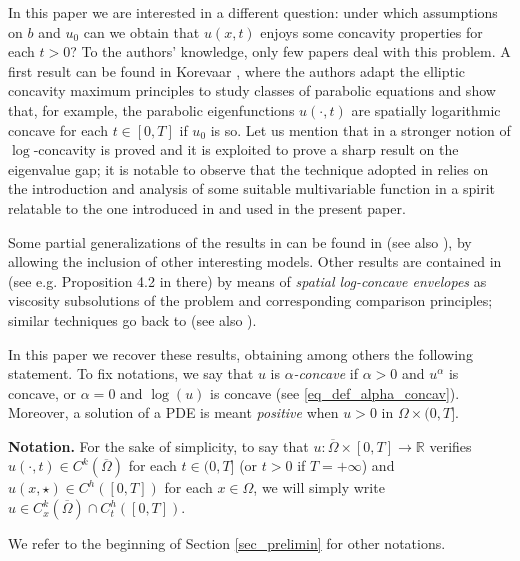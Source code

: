 \documentclass[11pt, reqno]{amsart}
\theoremstyle{definition}
\numberwithin{equation}{section}
\newcommand{\Omegabar}{\overline{\Omega}}
\newcommand{\R}{\mathbb{R}}
\begin{document}
In this paper we are interested in a different question: under which assumptions on $b$ and $u_0$ can we obtain that $u(x,t)$ enjoys some concavity properties for each $t>0$?
To the authors' knowledge, only few papers deal with this problem. 
A first result can be found in Korevaar \cite{Korevaar}, where the authors adapt the elliptic concavity maximum principles to study classes of parabolic equations and show that, for example, the parabolic eigenfunctions $u(\cdot, t)$ are spatially logarithmic concave for each $t \in [0,T]$ if $u_0$ is so. 
Let us mention that in \cite{AnCl11} a stronger notion of $\log$-concavity is proved and it is exploited to prove a sharp result on the eigenvalue gap; it is notable to observe that the technique adopted in \cite{AnCl11} relies on the introduction and analysis of some suitable multivariable function in a spirit relatable to the one introduced in \cite{Korevaar, kennington} and used in the present paper.

Some partial generalizations of the results in \cite{Korevaar} can be found in \cite{PorruSerra} (see also \cite{GrecoKawohl}), by allowing the inclusion of other interesting models. 
Other results are contained in \cite{IshigeSalaniTakatsu2024} (see e.g. Proposition 4.2 in there) by means of \emph{spatial log-concave envelopes} as viscosity subsolutions of the problem and corresponding comparison principles; similar techniques go back to \cite{AlvarezLasryLions1997} (see also \cite{ColesantiSalani2003}).

\smallskip

In this paper we recover these results, obtaining among others the following statement. To fix notations, we say that $u$ is \emph{$\alpha$-concave} if $\alpha>0$ and $u^{\alpha}$ is concave, or $\alpha=0$ and $\log(u)$ is concave (see \eqref{eq_def_alpha_concav}). Moreover, a solution of a PDE is meant \textit{positive} when $u>0$ in $\Omega\times (0,T]$.

\smallskip
 \textbf{Notation.} For the sake of simplicity, to say that $u\colon \Omegabar \times [0,T] \to \R$ verifies $u(\cdot, t) \in C^k(\Omegabar)$ for each $t \in (0,T]$ (or $t>0$ if $T=+\infty$) and $u(x, \star) \in C^h([0,T])$ for each $x \in \Omega$, we will simply write %
$u \in C^k_x(\Omegabar) \cap C^h_t([0,T])$.

We refer to the beginning of Section \ref{sec_prelimin} for other notations.
\end{document}

